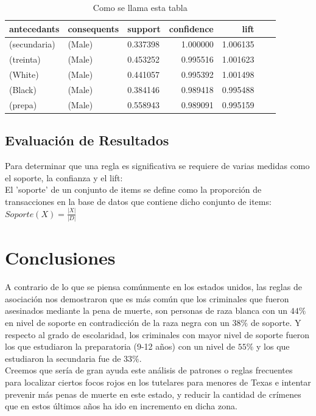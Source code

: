 \documentclass[sigconf]{acmart}
\begin{document}
\begin{table}[bt]
\begin{tabular}{lllrrrr}
\toprule
  antecedants & consequents &   support &  confidence &      lift \\
\midrule
  (secundaria) &      (Male) &  0.337398 &    1.000000 &  1.006135 \\
     (treinta) &      (Male) &  0.453252 &    0.995516 &  1.001623  \\
       (White) &      (Male) &  0.441057 &    0.995392 &  1.001498 \\
     (Black) &      (Male) &  0.384146 &    0.989418 &  0.995488  \\
      (prepa) &      (Male) &  0.558943 &    0.989091 &  0.995159 \\
\bottomrule
\end{tabular}
\caption{Como se llama esta tabla}
\label{tab:resultado}
\end{table}


\subsection{Evaluación de Resultados}
Para determinar que una regla es significativa se requiere de varias medidas como el soporte, la confianza y el lift:\\
El 'soporte' de un conjunto de items se define como la proporción de transacciones en la base de datos que contiene dicho conjunto de items:\\
$Soporte(X)=\frac{|X|}{|D|}$\\




\section{Conclusiones}
A contrario de lo que se piensa comúnmente en los estados unidos, las reglas de asociación nos demostraron que es más común que los criminales que fueron asesinados mediante la pena de muerte, son personas de raza blanca con un $44\%$ en nivel de soporte en contradicción de la raza negra con un $38\%$ de soporte. Y respecto al grado de escolaridad, los criminales con mayor nivel de soporte fueron los que estudiaron la preparatoria (9-12 años) con un nivel de $55\%$ y los que estudiaron la secundaria fue de $33\%$.\\ Creemos que sería de gran ayuda este análisis de patrones o reglas frecuentes para localizar ciertos focos rojos en los tutelares para menores de Texas e intentar prevenir más penas de muerte en este estado, y reducir la cantidad de crímenes que en estos últimos años ha ido en incremento en dicha zona.\\




{}


 
\end{document}
